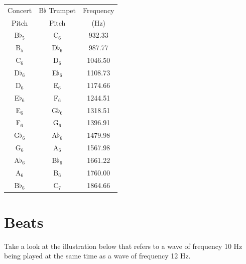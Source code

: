\documentclass[10pt]{exam}
\begin{document}
\begin{multicols}{3}
  \begin{tabular}{ccc}
    Concert & B$\flat$ Trumpet & Frequency \\
    Pitch   &  Pitch & (Hz) \\ 
    \hline\hline
    B$\flat_5$ & C$_6$ & 932.33 \\
    B$_5$ & D$\flat_6$ & 987.77 \\
    C$_6$ & D$_6$ & 1046.50 \\
    D$\flat_6$ & E$\flat_6$ & 1108.73 \\
    D$_6$ & E$_6$ & 1174.66 \\
    E$\flat_6$ & F$_6$ & 1244.51 \\
    E$_6$ & G$\flat_6$ & 1318.51 \\
    F$_6$ & G$_6$ & 1396.91 \\
    G$\flat_6$ & A$\flat_6$ & 1479.98 \\
    G$_6$ & A$_6$ & 1567.98 \\
    A$\flat_6$ & B$\flat_6$ & 1661.22 \\
    A$_6$ & B$_6$ & 1760.00 \\
    \hline
    B$\flat_6$ & C$_7$ & 1864.66 \\
    \hline
  \end{tabular}
  
\end{multicols}



\pagebreak 
\section*{Beats}
  
\vspace{10em}
  

\vspace{3em}

\noindent
Take a look at the illustration below that refers to a wave of frequency 10 Hz being played at the same time as a wave of frequency 12 Hz.
\end{document}
